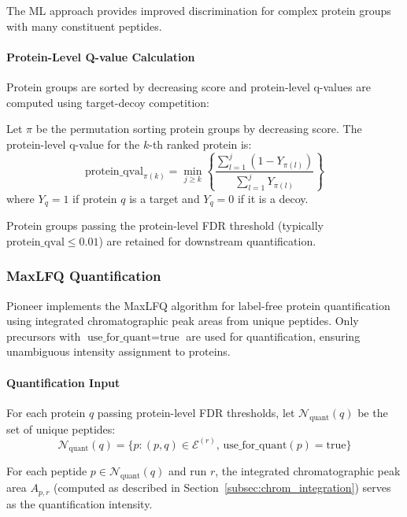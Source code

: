 \documentclass{article}
\begin{document}
The ML approach provides improved discrimination for complex protein groups with many constituent peptides.

\paragraph{Protein-Level Q-value Calculation} Protein groups are sorted by decreasing score and protein-level q-values are computed using target-decoy competition:

Let $\pi$ be the permutation sorting protein groups by decreasing score. The protein-level q-value for the $k$-th ranked protein is:
\begin{equation}
\text{protein\_qval}_{\pi(k)} = \min_{j \geq k} \left\{ \frac{\sum_{l=1}^{j} (1 - Y_{\pi(l)})}{\sum_{l=1}^{j} Y_{\pi(l)}} \right\}
\end{equation}
where $Y_q = 1$ if protein $q$ is a target and $Y_q = 0$ if it is a decoy.

Protein groups passing the protein-level FDR threshold (typically $\text{protein\_qval} \leq 0.01$) are retained for downstream quantification.

\subsubsection{MaxLFQ Quantification}

Pioneer implements the MaxLFQ algorithm \cite{Cox2014} for label-free protein quantification using integrated chromatographic peak areas from unique peptides. Only precursors with $\text{use\_for\_quant} = \text{true}$ are used for quantification, ensuring unambiguous intensity assignment to proteins.

\paragraph{Quantification Input} For each protein $q$ passing protein-level FDR thresholds, let $\mathcal{N}_{\text{quant}}(q)$ be the set of unique peptides:
\begin{equation}
\mathcal{N}_{\text{quant}}(q) = \{p : (p, q) \in \mathcal{E}^{(r)}, \, \text{use\_for\_quant}(p) = \text{true}\}
\end{equation}

For each peptide $p \in \mathcal{N}_{\text{quant}}(q)$ and run $r$, the integrated chromatographic peak area $A_{p,r}$ (computed as described in Section~\ref{subsec:chrom_integration}) serves as the quantification intensity.
\end{document}
